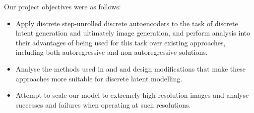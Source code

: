 
Our project objectives were as follows:
\begin{itemize}
    \item Apply discrete step-unrolled discrete autoencoders to the task of
        discrete latent generation and ultimately image generation, and perform
        analysis into their advantages of being used for this task over existing
        approaches, including both autoregressive and non-autoregressive
        solutions.
    \item Analyse the methods used in \citet{savinov2022stepunrolled} and
        \citet{nawrot2021hierarchical} and design modifications that make these
        approaches more suitable for discrete latent modelling.
    \item Attempt to scale our model to extremely high resolution images and
        analyse successes and failures when operating at such resolutions. 
\end{itemize}

